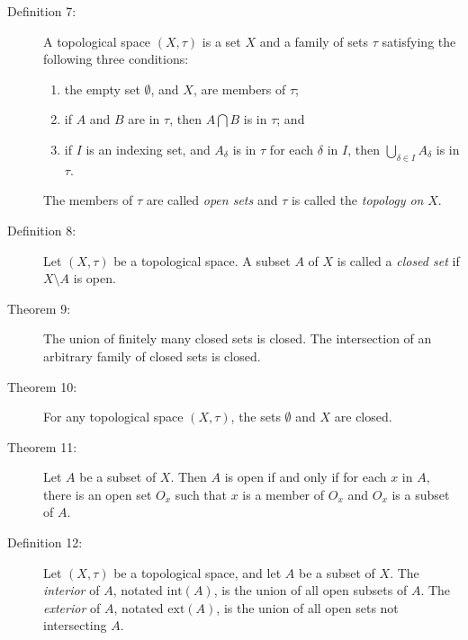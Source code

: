 \documentclass{article}
\begin{document}
\begin{description}

  \item[Definition 7:] A topological space $(X,\tau)$ is a set $X$ and a family of sets $\tau$ satisfying the following three conditions:
    \begin{enumerate}[\hspace{1cm}1.]
      \item the empty set $\emptyset$, and $X$, are members of $\tau$;
      \item if $A$ and $B$ are in $\tau$, then $A \bigcap B$ is in $\tau$; and
      \item if $I$ is an indexing set, and $A_{\delta}$ is in $\tau$ for each $\delta$ in $I$, then $\bigcup_{\delta \in I} A_{\delta}$ is in $\tau$.
    \end{enumerate}
    The members of $\tau$ are called \emph{open sets} and $\tau$ is called the \emph{topology on} $X$.

  \item[Definition 8:] Let $(X,\tau)$ be a topological space. A subset $A$ of $X$ is called a \emph{closed set} if $X \setminus A$ is open.

  \item[Theorem 9:] The union of finitely many closed sets is closed. The intersection of an arbitrary family of closed sets is closed.

  \item[Theorem 10:] For any topological space $(X, \tau)$, the sets $\emptyset$ and $X$ are closed.

  \item[Theorem 11:] Let $A$ be a subset of $X$. Then $A$ is open if and only if for each $x$ in $A$, there is an open set $O_{x}$ such that $x$ is a member of $O_{x}$ and $O_{x}$ is a subset of $A$.

  \item[Definition 12:] Let $(X,\tau)$ be a topological space, and let $A$ be a subset of $X$. The \emph{interior} of $A$, notated $\text{int} (A)$, is the union of all open subsets of $A$. The \emph{exterior} of $A$, notated $\text{ext} (A)$, is the union of all open sets not intersecting $A$.


\end{description}
\end{document}
